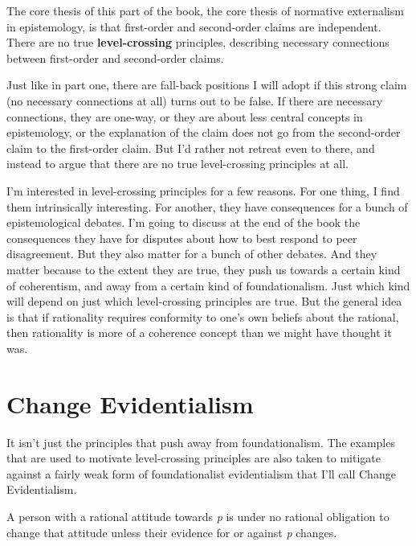 \documentclass[
  10pt,
  letterpaper,
  twoside]{scrbook}
\providecommand{\tightlist}{%
  \setlength{\itemsep}{0pt}\setlength{\parskip}{0pt}}\usepackage{longtable,booktabs,array}
\begin{document}
The core thesis of this part of the book, the core thesis of normative
externalism in epistemology, is that first-order and second-order claims
are independent. There are no true \textbf{level-crossing} principles,
describing necessary connections between first-order and second-order
claims.

Just like in part one, there are fall-back positions I will adopt if
this strong claim (no necessary connections at all) turns out to be
false. If there are necessary connections, they are one-way, or they are
about less central concepts in epistemology, or the explanation of the
claim does not go from the second-order claim to the first-order claim.
But I'd rather not retreat even to there, and instead to argue that
there are no true level-crossing principles at all.

I'm interested in level-crossing principles for a few reasons. For one
thing, I find them intrinsically interesting. For another, they have
consequences for a bunch of epistemological debates. I'm going to
discuss at the end of the book the consequences they have for disputes
about how to best respond to peer disagreement. But they also matter for
a bunch of other debates. And they matter because to the extent they are
true, they push us towards a certain kind of coherentism, and away from
a certain kind of foundationalism. Just which kind will depend on just
which level-crossing principles are true. But the general idea is that
if rationality requires conformity to one's own beliefs about the
rational, then rationality is more of a coherence concept than we might
have thought it was.

\section{Change Evidentialism}\label{changeevidentialism}

It isn't just the principles that push away from foundationalism. The
examples that are used to motivate level-crossing principles are also
taken to mitigate against a fairly weak form of foundationalist
evidentialism that I'll call Change Evidentialism.

\begin{description}
\tightlist
\item[Change Evidentialism]
A person with a rational attitude towards \emph{p} is under no rational
obligation to change that attitude unless their evidence for or against
\emph{p} changes.
\end{description}
\end{document}
